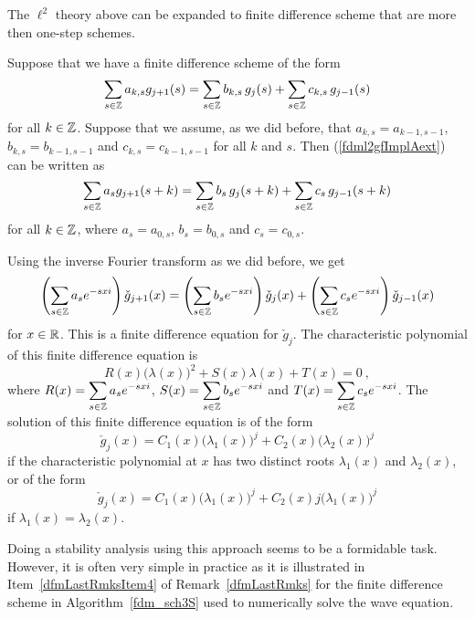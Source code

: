 \begin{rmk}
The $\ell^2$ theory above can be expanded to finite difference scheme
that are more then one-step schemes.   \label{ell2TheoryMsteps}

Suppose that we have a finite difference scheme of the form
\begin{equation} \label{fdml2gfImplAext}
\sum_{s\in \mathbb{Z}} a_{k,s} g_{j+1}(s) = \sum_{s\in \mathbb{Z}} b_{k,s}\, g_j(s)
+ \sum_{s\in \mathbb{Z}} c_{k,s}\, g_{j-1}(s)
\end{equation}
for all $k \in \mathbb{Z}$.  Suppose that we assume, as we did before,
that $a_{k,s} = a_{k-1,s-1}$, $b_{k,s} = b_{k-1,s-1}$ and
$c_{k,s} = c_{k-1,s-1}$ for all $k$ and $s$.  Then
(\ref{fdml2gfImplAext}) can be written as
\begin{equation} \label{fdml2gfImplext}
\sum_{s\in \mathbb{Z}} a_s g_{j+1}(s+k) = \sum_{s\in \mathbb{Z}} b_s\, g_j(s+k)
+ \sum_{s\in \mathbb{Z}} c_s\, g_{j-1}(s+k)
\end{equation}
for all $k\in \mathbb{Z}$, where $a_s = a_{0,s}$, $b_s = b_{0,s}$ and $c_s = c_{0,s}$.

Using the inverse Fourier transform as we did before, we get
\[
\left( \sum_{s\in \mathbb{Z}} a_s e^{-sx i} \right) \check{g}_{j+1}(x)
= \left( \sum_{s\in \mathbb{Z}} b_s e^{-sx i} \right) \check{g}_j(x)
+ \left( \sum_{s\in \mathbb{Z}} c_s e^{-sx i} \right) \check{g}_{j-1}(x)
\]
for $x\in \mathbb{R}$.  This is a finite difference equation for
$\check{g}_j$.  The characteristic polynomial of this finite
difference equation is
\begin{equation}\label{fdml2gfImplBext}
R(x) \big(\lambda(x)\big)^2 + S(x) \lambda(x) + T(x) = 0 \ ,
\end{equation}
where 
$\displaystyle R(x) = \sum_{s\in \mathbb{Z}} a_s e^{-sx i}$,
$\displaystyle S(x) = \sum_{s\in \mathbb{Z}} b_s e^{-sx i}$ and
$\displaystyle T(x) = \sum_{s\in \mathbb{Z}} c_s e^{-sx i}$.
The solution of this finite difference equation is of the form
\[
\check{g}_j(x) = C_1(x) \big(\lambda_1(x)\big)^j
+ C_2(x) \big(\lambda_2(x)\big)^j 
\]
if the characteristic polynomial at $x$ has two distinct roots
$\displaystyle \lambda_1(x)$ and $\displaystyle \lambda_2(x)$, or of
the form
\[
\check{g}_j(x) = C_1(x) \big(\lambda_1(x)\big)^j + C_2(x)j
\big(\lambda_1(x)\big)^j 
\]
if $\displaystyle \lambda_1(x) = \lambda_2(x)$.

Doing a stability analysis using this approach seems to be a
formidable task.  However, it is often very simple in practice as
it is illustrated in Item~\ref{dfmLastRmksItem4} of
Remark~\ref{dfmLastRmks} for the finite difference
scheme in Algorithm~\ref{fdm_sch3S} used to numerically solve the wave
equation.
\end{rmk}

